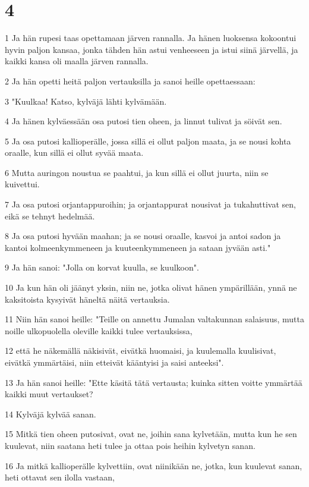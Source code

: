 \chapter{4}

\par 1 Ja hän rupesi taas opettamaan järven rannalla. Ja hänen luoksensa kokoontui hyvin paljon kansaa, jonka tähden hän astui venheeseen ja istui siinä järvellä, ja kaikki kansa oli maalla järven rannalla.
\par 2 Ja hän opetti heitä paljon vertauksilla ja sanoi heille opettaessaan:
\par 3 "Kuulkaa! Katso, kylväjä lähti kylvämään.
\par 4 Ja hänen kylväessään osa putosi tien oheen, ja linnut tulivat ja söivät sen.
\par 5 Ja osa putosi kallioperälle, jossa sillä ei ollut paljon maata, ja se nousi kohta oraalle, kun sillä ei ollut syvää maata.
\par 6 Mutta auringon noustua se paahtui, ja kun sillä ei ollut juurta, niin se kuivettui.
\par 7 Ja osa putosi orjantappuroihin; ja orjantappurat nousivat ja tukahuttivat sen, eikä se tehnyt hedelmää.
\par 8 Ja osa putosi hyvään maahan; ja se nousi oraalle, kasvoi ja antoi sadon ja kantoi kolmeenkymmeneen ja kuuteenkymmeneen ja sataan jyvään asti."
\par 9 Ja hän sanoi: "Jolla on korvat kuulla, se kuulkoon".
\par 10 Ja kun hän oli jäänyt yksin, niin ne, jotka olivat hänen ympärillään, ynnä ne kaksitoista kysyivät häneltä näitä vertauksia.
\par 11 Niin hän sanoi heille: "Teille on annettu Jumalan valtakunnan salaisuus, mutta noille ulkopuolella oleville kaikki tulee vertauksissa,
\par 12 että he näkemällä näkisivät, eivätkä huomaisi, ja kuulemalla kuulisivat, eivätkä ymmärtäisi, niin etteivät kääntyisi ja saisi anteeksi".
\par 13 Ja hän sanoi heille: "Ette käsitä tätä vertausta; kuinka sitten voitte ymmärtää kaikki muut vertaukset?
\par 14 Kylväjä kylvää sanan.
\par 15 Mitkä tien oheen putosivat, ovat ne, joihin sana kylvetään, mutta kun he sen kuulevat, niin saatana heti tulee ja ottaa pois heihin kylvetyn sanan.
\par 16 Ja mitkä kallioperälle kylvettiin, ovat niinikään ne, jotka, kun kuulevat sanan, heti ottavat sen ilolla vastaan,
